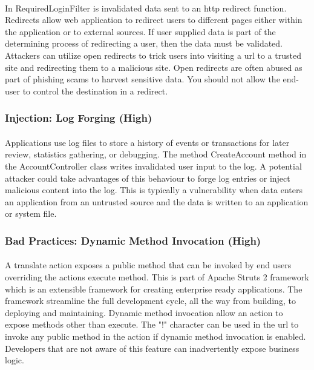 \documentclass[11pt,english,a4paper]{report}
\begin{document}
\paragraph{}
In RequiredLoginFilter is invalidated data sent to an \gls{http} redirect function. 
Redirects allow web application to redirect users to different pages either within the application or to external sources.
If user supplied data is part of the determining process of redirecting a user, then the data must be validated.
Attackers can utilize open redirects to trick users into visiting a \gls{url} to a trusted site and redirecting them to a malicious site.
Open redirects are often abused as part of phishing scams to harvest sensitive data.
You should not allow the end-user to control the destination in a redirect.

\subsubsection{Injection: Log Forging (High)}
\paragraph{}
Applications use log files to store a history of events or transactions for later review, statistics gathering, or debugging.
The method CreateAccount method in the AccountController class writes invalidated user input to the log.
A potential attacker could take advantages of this behaviour to forge log entries or inject malicious content into the log.
This is typically a vulnerability when data enters an application from an untrusted source and the data is written to an application or system file.


\subsubsection{Bad Practices: Dynamic Method Invocation (High)}
\paragraph{}
A translate action exposes a public method that can be invoked by end users overriding the actions execute method.
This is part of Apache Struts 2 framework which is an extensible framework for creating enterprise ready applications.
The framework streamline the full development cycle, all the way from building, to deploying and maintaining. 
Dynamic method invocation allow an action to expose methods other than execute.
The "!" character can be used in the \gls{url} to invoke any public method in the action if dynamic method invocation is enabled.
Developers that are not aware of this feature can inadvertently expose business logic. 
\end{document}

